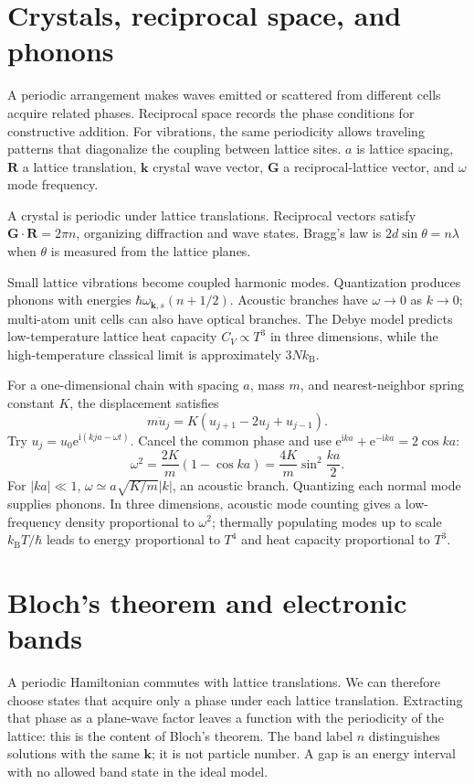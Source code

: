 \documentclass[11pt,oneside]{book}
\newcommand{\ii}{\mathrm{i}}
\newcommand{\ee}{\mathrm{e}}
\newcommand{\vect}[1]{\boldsymbol{#1}}
\newcommand{\kb}{k_{\mathrm B}}
\theoremstyle{reviewstyle}
\begin{document}
\section{Crystals, reciprocal space, and phonons}
A periodic arrangement makes waves emitted or scattered from different cells acquire related phases. Reciprocal space records the phase conditions for constructive addition. For vibrations, the same periodicity allows traveling patterns that diagonalize the coupling between lattice sites. $a$ is lattice spacing, $\vect R$ a lattice translation, $\vect k$ crystal wave vector, $\vect G$ a reciprocal-lattice vector, and $\omega$ mode frequency.

A crystal is periodic under lattice translations. Reciprocal vectors satisfy $\vect G\cdot\vect R=2\pi n$, organizing diffraction and wave states. Bragg's law is $2d\sin\theta=n\lambda$ when $\theta$ is measured from the lattice planes.

Small lattice vibrations become coupled harmonic modes. Quantization produces phonons with energies $\hbar\omega_{\vect k,s}(n+1/2)$. Acoustic branches have $\omega\to0$ as $k\to0$; multi-atom unit cells can also have optical branches. The Debye model predicts low-temperature lattice heat capacity $C_V\propto T^3$ in three dimensions, while the high-temperature classical limit is approximately $3N\kb$.

For a one-dimensional chain with spacing $a$, mass $m$, and nearest-neighbor spring constant $K$, the displacement satisfies
\begin{equation}
m\ddot u_j=K(u_{j+1}-2u_j+u_{j-1}).
\end{equation}
Try $u_j=u_0\ee^{\ii(kja-\omega t)}$. Cancel the common phase and use $\ee^{\ii ka}+\ee^{-\ii ka}=2\cos ka$:
\begin{equation}
\omega^2=\frac{2K}{m}(1-\cos ka)
=\frac{4K}{m}\sin^2\frac{ka}{2}.
\end{equation}
For $|ka|\ll1$, $\omega\simeq a\sqrt{K/m}|k|$, an acoustic branch. Quantizing each normal mode supplies phonons. In three dimensions, acoustic mode counting gives a low-frequency density proportional to $\omega^2$; thermally populating modes up to scale $\kb T/\hbar$ leads to energy proportional to $T^4$ and heat capacity proportional to $T^3$.

\section{Bloch's theorem and electronic bands}
A periodic Hamiltonian commutes with lattice translations. We can therefore choose states that acquire only a phase under each lattice translation. Extracting that phase as a plane-wave factor leaves a function with the periodicity of the lattice: this is the content of Bloch's theorem. The band label $n$ distinguishes solutions with the same $\vect k$; it is not particle number. A gap is an energy interval with no allowed band state in the ideal model.
\end{document}
